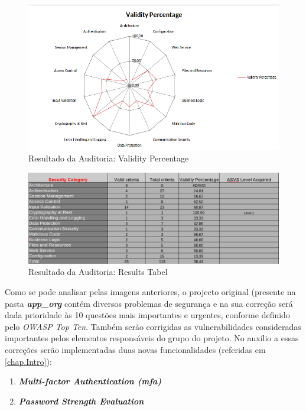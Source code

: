 \begin{figure}[H]
      \centering
      \includegraphics[width=16cm]{images/ASVS Results.png}
      \caption{Resultado da Auditoria: Validity Percentage}
      \label{fig:asvs_valid}
\end{figure}

\begin{figure}[H]
      \centering
      \includegraphics[width=16cm]{images/ASVS Results Tab.png}
      \caption{Resultado da Auditoria: Results Tabel}
      \label{fig:asvs_tab}
\end{figure}

Como se pode analisar pelas imagens anteriores, o projecto original (presente na pasta \textbf{\textit{app\_org}} contém diversos problemas de segurança e na sua correção será dada prioridade às 10 questões mais importantes e urgentes, conforme definido pelo \textit{OWASP Top Ten}. Também serão corrigidas as  vulnerabilidades consideradas importantes pelos elementos responsáveis do grupo do projeto. No auxílio a essas correções serão implementadas duas novas funcionalidades (referidas em \ref{chap.Intro}):

\begin{enumerate}
    \item \textbf{\textit{Multi-factor Authentication (\ac{mfa})}}
    \item \textbf{\textit{Password Strength Evaluation}}
\end{enumerate}

